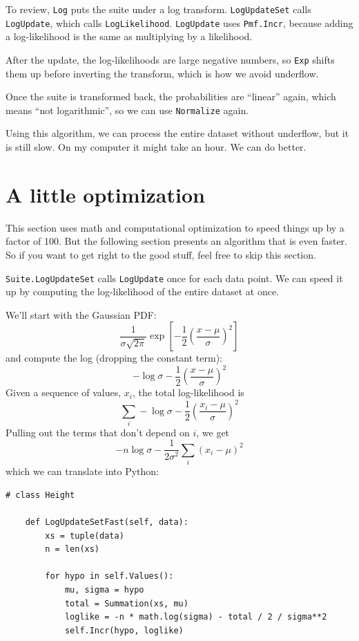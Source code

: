 \documentclass[12pt]{book}
\begin{document}
To review, {\tt Log} puts the suite under a log transform.
{\tt LogUpdateSet} calls {\tt LogUpdate}, which calls
{\tt LogLikelihood}.  {\tt LogUpdate} uses {\tt Pmf.Incr},
because adding a log-likelihood is the same as multiplying
by a likelihood.

After the update, the log-likelihoods are large negative
numbers, so {\tt Exp} shifts them up before inverting the
transform, which is how we avoid underflow.

Once the suite is transformed back, the probabilities
are ``linear'' again, which means ``not logarithmic'',
so we can use {\tt Normalize} again.

Using this algorithm, we can process the entire dataset without
underflow, but it is still slow.  On my computer it might
take an hour.  We can do better.


\section{A little optimization}

This section uses math and computational optimization
to speed things up by a factor of 100.  But the following section
presents an algorithm that is even faster.  So if you want to
get right to the good stuff, feel free to skip this section.

{\tt Suite.LogUpdateSet} calls {\tt LogUpdate} once for each data
point.  We can speed it up by computing the log-likelihood of the entire
dataset at once.

We'll start with the Gaussian PDF:
%
\[ \frac{1}{\sigma \sqrt{2 \pi}} \exp \left[ -\frac{1}{2} \left( \frac{x-\mu}{\sigma} \right)^2 \right] \]
%
and compute the log (dropping the constant term):
%
\[ -\log \sigma -\frac{1}{2} \left( \frac{x-\mu}{\sigma} \right)^2 \]
%
Given a sequence of values, $x_i$, the total log-likelihood is
%
\[ \sum_i -\log \sigma - \frac{1}{2} \left( \frac{x_i-\mu}{\sigma} \right)^2 \]
%
Pulling out the terms that don't depend on $i$, we get
%
\[ -n \log \sigma - \frac{1}{2 \sigma^2} \sum_i (x_i - \mu)^2 \]
%
which we can translate into Python:

\begin{verbatim}
# class Height

    def LogUpdateSetFast(self, data):
        xs = tuple(data)
        n = len(xs)

        for hypo in self.Values():
            mu, sigma = hypo
            total = Summation(xs, mu)
            loglike = -n * math.log(sigma) - total / 2 / sigma**2
            self.Incr(hypo, loglike)
\end{verbatim}
\end{document}
